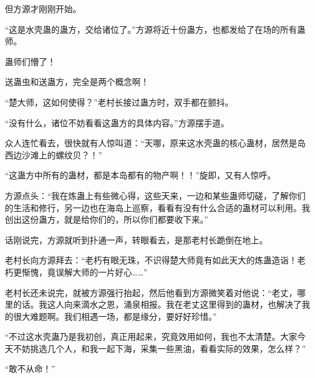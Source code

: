 \begin{this_body}
但方源才刚刚开始。

“这是水壳蛊的蛊方，交给诸位了。”方源将近十份蛊方，也都发给了在场的所有蛊师。

蛊师们懵了！

送蛊虫和送蛊方，完全是两个概念啊！

“楚大师，这如何使得？”老村长接过蛊方时，双手都在颤抖。

“没有什么，诸位不妨看看这蛊方的具体内容。”方源摆手道。

众人连忙看去，很快就有人惊叫道：“天哪，原来这水壳蛊的核心蛊材，居然是岛西边沙滩上的螺纹贝？！”

“这蛊方中所有的蛊材，都是本岛都有的物产啊！！”旋即，又有人惊呼。

方源点头：“我在炼蛊上有些微心得，这些天来，一边和某些蛊师切磋，了解你们的生活和修行，另一边也在海岛上巡察，看看有没有什么合适的蛊材可以利用。我创出这份蛊方，就是给你们的，所以你们都要收下来。”

话刚说完，方源就听到扑通一声，转眼看去，是那老村长跪倒在地上。

老村长向方源拜去：“老朽有眼无珠，不识得楚大师竟有如此天大的炼蛊造诣！老朽更惭愧，竟误解大师的一片好心……”

老村长还未说完，就被方源强行抬起，然后他看到方源微笑着对他说：“老丈，哪里的话。我这人向来滴水之恩，涌泉相报。我在老丈这里得到的蛊材，也解决了我的很大难题啊。我们相遇一场，都是缘分，要好好珍惜。”

“不过这水壳蛊乃是我初创，真正用起来，究竟效用如何，我也不太清楚。大家今天不妨挑选几个人，和我一起下海，采集一些黑油，看看实际的效果，怎么样？”

“敢不从命！”

\end{this_body}

